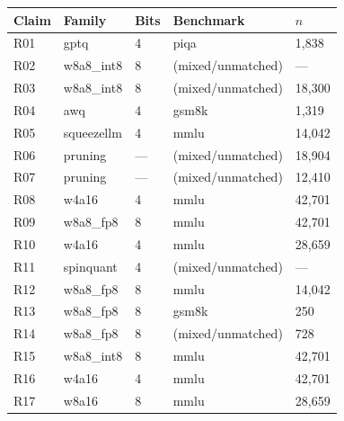 \begin{table}[!tp]
\begin{tabular}{@{}lllll@{}}
\toprule
Claim & Family & Bits & Benchmark & $n$ \\
\midrule
R01 & gptq & 4 & piqa & 1{,}838 \\
R02 & w8a8\_int8 & 8 & (mixed/unmatched) & --- \\
R03 & w8a8\_int8 & 8 & (mixed/unmatched) & 18{,}300 \\
R04 & awq & 4 & gsm8k & 1{,}319 \\
R05 & squeezellm & 4 & mmlu & 14{,}042 \\
R06 & pruning & --- & (mixed/unmatched) & 18{,}904 \\
R07 & pruning & --- & (mixed/unmatched) & 12{,}410 \\
R08 & w4a16 & 4 & mmlu & 42{,}701 \\
R09 & w8a8\_fp8 & 8 & mmlu & 42{,}701 \\
R10 & w4a16 & 4 & mmlu & 28{,}659 \\
R11 & spinquant & 4 & (mixed/unmatched) & --- \\
R12 & w8a8\_fp8 & 8 & mmlu & 14{,}042 \\
R13 & w8a8\_fp8 & 8 & gsm8k & 250 \\
R14 & w8a8\_fp8 & 8 & (mixed/unmatched) & 728 \\
R15 & w8a8\_int8 & 8 & mmlu & 42{,}701 \\
R16 & w4a16 & 4 & mmlu & 42{,}701 \\
R17 & w8a16 & 8 & mmlu & 28{,}659 \\
\bottomrule
\end{tabular}


\end{table}
